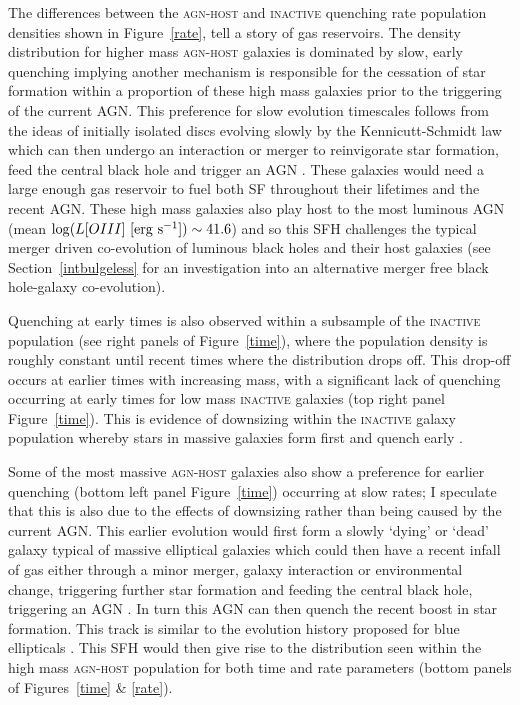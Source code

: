 The differences between the \textsc{agn-host} and \textsc{inactive} quenching rate population densities shown in Figure~\ref{rate}, tell a story of gas reservoirs. The density distribution for higher mass \textsc{agn-host} galaxies is dominated by slow, early quenching implying another mechanism is responsible for the cessation of star formation within a proportion of these high mass galaxies prior to the triggering of the current AGN.  This preference for slow evolution timescales follows from the ideas of initially isolated discs evolving slowly by the Kennicutt-Schmidt \citep{Schmidt59, Kennicutt97} law which can then undergo an interaction or merger to reinvigorate star formation, feed the central black hole and trigger an AGN \citep{Varela04, emsellem15}. These galaxies would need a large enough gas reservoir to fuel both SF throughout their lifetimes and the recent AGN. These high mass galaxies also play host to the most luminous AGN (mean $\log (L[OIII] ~[\rm{erg}~s^{-1}]) \sim 41.6$) and so this SFH challenges the typical merger driven co-evolution of luminous black holes and their host galaxies (see Section~\ref{intbulgeless} for an investigation into an alternative merger free black hole-galaxy co-evolution). 


Quenching at early times is also observed within a subsample of the \textsc{inactive} population (see right panels of Figure~\ref{time}), where the population density is roughly constant until recent times where the distribution drops off.  This drop-off occurs at earlier times with increasing mass, with a significant lack of quenching occurring at early times for low mass \textsc{inactive} galaxies (top right panel Figure~\ref{time}). This is evidence of downsizing within the \textsc{inactive} galaxy population whereby stars in massive galaxies form first and quench early \citep{Cowie96, Thomas10}. 

Some of the most massive \textsc{agn-host} galaxies also show a preference for earlier quenching (bottom left panel Figure~\ref{time}) occurring at slow rates; I speculate that this is also due to the effects of downsizing rather than being caused by the current AGN. This earlier evolution would first form a slowly `dying' or `dead' galaxy typical of massive elliptical galaxies which could then have a recent infall of gas either through a minor merger, galaxy interaction or environmental change, triggering further star formation and feeding the central black hole, triggering an AGN \citep{kaviraj14b}. In turn this AGN can then quench the recent boost in star formation. This track is similar to the evolution history proposed for blue ellipticals \citep[][and detected in the top panel of Figure~\ref{blue_c}]{Kaviraj13, McIntosh14, Haines15}. This SFH would then give rise to the distribution seen within the high mass \textsc{agn-host} population for both time and rate parameters (bottom panels of Figures~\ref{time} \& \ref{rate}).


